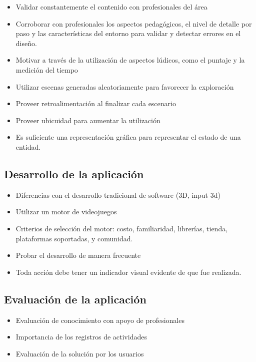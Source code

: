 \begin{itemize}
\item Validar constantemente el contenido con profesionales del área
\item Corroborar con profesionales los aspectos pedagógicos, el nivel de detalle
    por paso y las características del entorno para validar y detectar errores
    en el diseño. 
\item Motivar a través de la utilización de aspectos lúdicos, como el puntaje y
    la medición del tiempo
\item Utilizar escenas generadas aleatoriamente para favorecer la exploración
\item Proveer retroalimentación al finalizar cada escenario
\item Proveer ubicuidad para aumentar la utilización
\item Es suficiente una representación gráfica para representar el estado de una
    entidad.
\end{itemize}
 
\subsection{Desarrollo de la aplicación}

\begin{itemize}
\item Diferencias con el desarrollo tradicional de software (3D, input 3d)
\item Utilizar un motor de videojuegos
\item Criterios de selección del motor: costo, familiaridad, librerías, tienda,
    plataformas soportadas, y comunidad.
\item Probar el desarrollo de manera frecuente
\item Toda acción debe tener un indicador visual evidente de que fue realizada.
\end{itemize}
 
\subsection{Evaluación de la aplicación}

\begin{itemize}
\item Evaluación de conocimiento con apoyo de profesionales
\item Importancia de los registros de actividades
\item Evaluación de la solución por los usuarios
\end{itemize}

